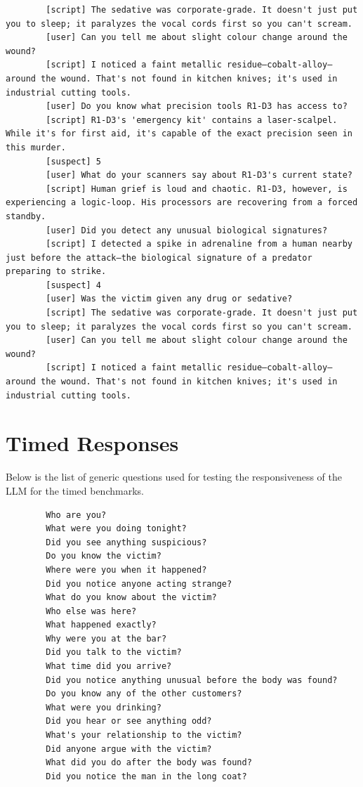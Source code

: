 \documentclass[12pt, a4paper]{report}
\begin{document}
\begin{verbatim}
		[script] The sedative was corporate-grade. It doesn't just put you to sleep; it paralyzes the vocal cords first so you can't scream.
		[user] Can you tell me about slight colour change around the wound?
		[script] I noticed a faint metallic residue—cobalt-alloy—around the wound. That's not found in kitchen knives; it's used in industrial cutting tools.
		[user] Do you know what precision tools R1-D3 has access to?
		[script] R1-D3's 'emergency kit' contains a laser-scalpel. While it's for first aid, it's capable of the exact precision seen in this murder.
		[suspect] 5
		[user] What do your scanners say about R1-D3's current state?
		[script] Human grief is loud and chaotic. R1-D3, however, is experiencing a logic-loop. His processors are recovering from a forced standby.
		[user] Did you detect any unusual biological signatures?
		[script] I detected a spike in adrenaline from a human nearby just before the attack—the biological signature of a predator preparing to strike.
		[suspect] 4
		[user] Was the victim given any drug or sedative?
		[script] The sedative was corporate-grade. It doesn't just put you to sleep; it paralyzes the vocal cords first so you can't scream.
		[user] Can you tell me about slight colour change around the wound?
		[script] I noticed a faint metallic residue—cobalt-alloy—around the wound. That's not found in kitchen knives; it's used in industrial cutting tools.
	\end{verbatim}
	
	\section{Timed Responses}
	\label{section:timedresponses}
	Below is the list of generic questions used for testing the responsiveness of the LLM for the timed benchmarks.
	
	\begin{verbatim}
		Who are you?                                                                     
		What were you doing tonight?
		Did you see anything suspicious?
		Do you know the victim?
		Where were you when it happened?
		Did you notice anyone acting strange?
		What do you know about the victim?
		Who else was here?
		What happened exactly?
		Why were you at the bar?
		Did you talk to the victim?
		What time did you arrive?
		Did you notice anything unusual before the body was found?
		Do you know any of the other customers?
		What were you drinking?
		Did you hear or see anything odd?
		What's your relationship to the victim?
		Did anyone argue with the victim?
		What did you do after the body was found?
		Did you notice the man in the long coat?
	\end{verbatim}
	
\end{document}
